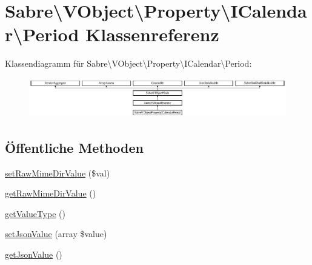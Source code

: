 \hypertarget{class_sabre_1_1_v_object_1_1_property_1_1_i_calendar_1_1_period}{}\section{Sabre\textbackslash{}V\+Object\textbackslash{}Property\textbackslash{}I\+Calendar\textbackslash{}Period Klassenreferenz}
\label{class_sabre_1_1_v_object_1_1_property_1_1_i_calendar_1_1_period}
Klassendiagramm für Sabre\textbackslash{}V\+Object\textbackslash{}Property\textbackslash{}I\+Calendar\textbackslash{}Period\+:\begin{figure}[H]
\begin{center}
\leavevmode
\includegraphics[height=1.743191cm]{class_sabre_1_1_v_object_1_1_property_1_1_i_calendar_1_1_period}
\end{center}
\end{figure}
\subsection*{Öffentliche Methoden}
\begin{DoxyCompactItemize}
\item 
\mbox{\hyperlink{class_sabre_1_1_v_object_1_1_property_1_1_i_calendar_1_1_period_a94cb6c6a4870903fcb8a95fd20ee0cb8}{set\+Raw\+Mime\+Dir\+Value}} (\$val)
\item 
\mbox{\hyperlink{class_sabre_1_1_v_object_1_1_property_1_1_i_calendar_1_1_period_ac775f47548631602a4ea53dc2347d82a}{get\+Raw\+Mime\+Dir\+Value}} ()
\item 
\mbox{\hyperlink{class_sabre_1_1_v_object_1_1_property_1_1_i_calendar_1_1_period_afad01e4b39cffc396a26aa9cd8c1fd71}{get\+Value\+Type}} ()
\item 
\mbox{\hyperlink{class_sabre_1_1_v_object_1_1_property_1_1_i_calendar_1_1_period_afb29a58b5ee13f84d57db0702dfade8e}{set\+Json\+Value}} (array \$value)
\item 
\mbox{\hyperlink{class_sabre_1_1_v_object_1_1_property_1_1_i_calendar_1_1_period_a4c74c24a13436ab84056e354dbd46050}{get\+Json\+Value}} ()
\end{DoxyCompactItemize}
